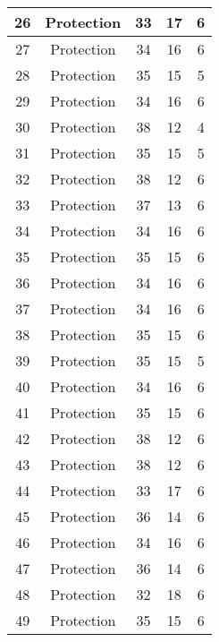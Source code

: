\documentclass[results.tex]{subfiles}
\begin{document}
\begin{center}
\begin{tabular}{| c || c | c | c | c |}
    \hline
    26 & Protection & 33 & 17 & 6 \\ 
    \hline
    27 & Protection & 34 & 16 & 6 \\ 
    \hline
    28 & Protection & 35 & 15 & 5 \\ 
    \hline
    29 & Protection & 34 & 16 & 6 \\ 
    \hline
    30 & Protection & 38 & 12 & 4 \\ 
    \hline
    31 & Protection & 35 & 15 & 5 \\ 
    \hline
    32 & Protection & 38 & 12 & 6 \\ 
    \hline
    33 & Protection & 37 & 13 & 6 \\ 
    \hline
    34 & Protection & 34 & 16 & 6 \\ 
    \hline
    35 & Protection & 35 & 15 & 6 \\ 
    \hline
    36 & Protection & 34 & 16 & 6 \\ 
    \hline
    37 & Protection & 34 & 16 & 6 \\ 
    \hline
    38 & Protection & 35 & 15 & 6 \\ 
    \hline
    39 & Protection & 35 & 15 & 5 \\ 
    \hline
    40 & Protection & 34 & 16 & 6 \\ 
    \hline
    41 & Protection & 35 & 15 & 6 \\ 
    \hline
    42 & Protection & 38 & 12 & 6 \\ 
    \hline
    43 & Protection & 38 & 12 & 6 \\ 
    \hline
    44 & Protection & 33 & 17 & 6 \\ 
    \hline
    45 & Protection & 36 & 14 & 6 \\ 
    \hline
    46 & Protection & 34 & 16 & 6 \\ 
    \hline
    47 & Protection & 36 & 14 & 6 \\ 
    \hline
    48 & Protection & 32 & 18 & 6 \\ 
    \hline
    49 & Protection & 35 & 15 & 6 \\ 
    \hline   \end{tabular}
\end{center}
\end{document}
